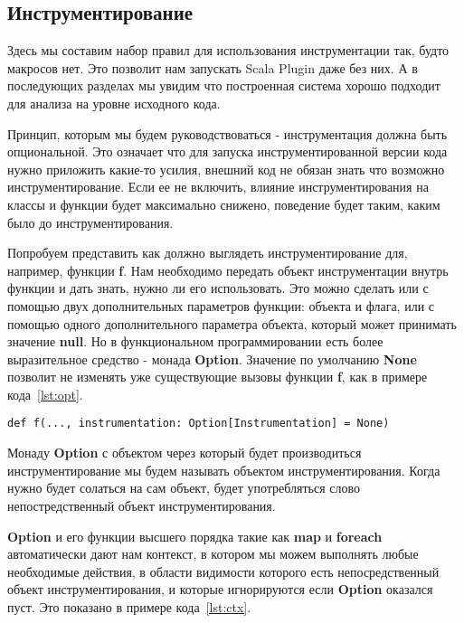 
\subsection{Инструментирование}
\label{sec:instrumentation}

Здесь мы составим набор правил для использования инструментации так,
будто макросов нет.
Это позволит нам запускать Scala Plugin даже без них.
А в последующих разделах мы увидим что построенная система хорошо подходит
для анализа на уровне исходного кода.

Принцип, которым мы будем руководствоваться - инструментация должна быть опциональной.
Это означает что для запуска инструментированной версии кода нужно приложить
какие-то усилия, внешний код не обязан знать что возможно инструментирование.
Если ее не включить, влияние инструментирования на классы и функции будет
максимально снижено, поведение будет таким, каким было до инструментирования.

Попробуем представить как должно выглядеть инструментирование для, например,
функции \textbf{f}.
Нам необходимо передать объект инструментации внутрь функции и дать знать,
нужно ли его использовать.
Это можно сделать или с помощью двух дополнительных параметров функции:
объекта и флага, или с помощью одного дополнительного параметра объекта,
который может принимать значение \textbf{null}.
Но в функциональном программировании есть более выразительное средство -
монада \textbf{Option}.
Значение по умолчанию \textbf{None} позволит не изменять уже существующие
вызовы функции \textbf{f}, как в примере кода~\ref{lst:opt}.

\begin{lstlisting}[caption={Явная передача объекта инструментирования внутрь функции},label=lst:opt]
def f(..., instrumentation: Option[Instrumentation] = None)
\end{lstlisting}

Монаду \textbf{Option} с объектом через который будет производиться
инструментирование мы будем называть объектом инструментирования.
Когда нужно будет солаться на сам объект, будет употребляться слово
непостредственный объект инструментирования.

\textbf{Option} и его функции высшего порядка такие как \textbf{map} и
\textbf{foreach} автоматически дают нам контекст, в котором мы можем выполнять
любые необходимые действия,
в области видимости которого есть непосредственный объект инструментирования,
и которые игнорируются если \textbf{Option} оказался пуст.
Это показано в примере кода~\ref{lst:ctx}.

